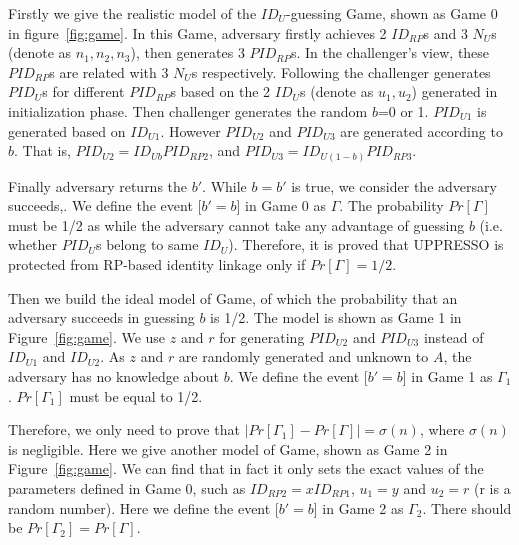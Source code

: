 Firstly we give the realistic model of the $ID_U$-guessing Game, shown as Game 0 in figure~\ref{fig:game}. In this Game, adversary firstly achieves 2 $ID_{RP}$s and 3 $N_U$s (denote as $n_1, n_2, n_3$), then generates 3 $PID_{RP}$s. In the challenger's view, these $PID_{RP}$s are related with 3 $N_U$s respectively. Following the challenger generates $PID_U$s for different $PID_{RP}$s based on the 2 $ID_U$s (denote as $u_1, u_2$) generated in initialization phase.
Then challenger generates the random $b$=0 or 1. $PID_{U1}$ is generated based on $ID_{U1}$. However $PID_{U2}$ and $PID_{U3}$ are generated according to $b$. That is, $PID_{U2}=ID_{Ub}PID_{RP2}$, and $PID_{U3}=ID_{U(1-b)}PID_{RP3}$.


Finally adversary returns the $b'$. While $b=b'$ is true, we consider the adversary succeeds,.
We define the event [$b'=b$] in Game 0 as $\Gamma$. The probability $Pr[\Gamma]$ must be 1/2 as while the adversary cannot take any advantage of guessing $b$ (i.e.  whether $PID_U$s belong to same $ID_U$). Therefore, it is proved that UPPRESSO is protected from RP-based identity linkage only if $Pr[\Gamma]=1/2$.

Then we build the ideal model of Game, of which the probability  that an adversary succeeds in guessing $b$ is 1/2. The model is shown as Game 1 in Figure~\ref{fig:game}. We use $z$ and $r$ for generating $PID_{U2}$ and $PID_{U3}$ instead of $ID_{U1}$ and $ID_{U2}$. As $z$ and $r$ are randomly generated and unknown to $A$, the adversary has no knowledge about $b$. We  define the event [$b'=b$] in Game 1 as $\Gamma_1$. $Pr[\Gamma_1]$ must be equal to 1/2.

Therefore, we only need to prove that $|Pr[\Gamma_1]-Pr[\Gamma]|=\sigma(n)$, where $\sigma(n)$ is negligible. Here we give another model of Game, shown as Game 2 in Figure~\ref{fig:game}. We can find that in fact it only sets the exact values of the parameters defined in Game 0, such as $ID_{RP2}=xID_{RP1}$, $u_1=y$ and $u_2=r$ (r is a random number).  Here we define the event [$b'=b$] in Game 2 as $\Gamma_2$. There should be $Pr[\Gamma_2]=Pr[\Gamma]$.

